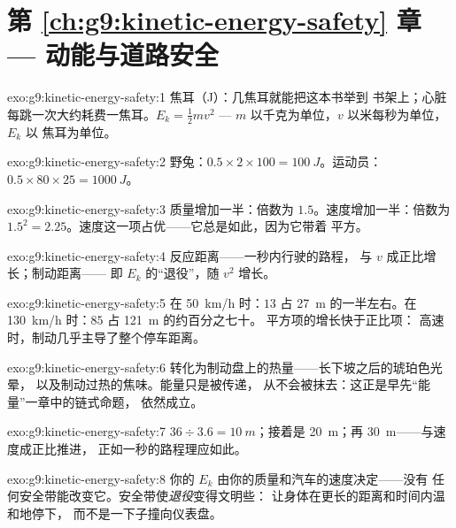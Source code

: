 \section*{第 \ref{ch:g9:kinetic-energy-safety} 章 --- 动能与道路安全}

\begin{solution}{exo:g9:kinetic-energy-safety:1}
焦耳（\unit{J}）：几焦耳就能把这本书举到
书架上；心脏每跳一次大约耗费一焦耳。$E_k = \frac12 m
v^2$ --- $m$ 以千克为单位，$v$ 以米每秒为单位，$E_k$ 以
焦耳为单位。
\end{solution}

\begin{solution}{exo:g9:kinetic-energy-safety:2}
野兔：$0.5 \times 2 \times 100 = \qty{100}{J}$。运动员：$0.5
\times 80 \times 25 = \qty{1000}{J}$。
\end{solution}

\begin{solution}{exo:g9:kinetic-energy-safety:3}
质量增加一半：倍数为 $1.5$。速度增加一半：倍数为 $1.5^2
= 2.25$。速度这一项占优——它总是如此，因为它带着
平方。
\end{solution}

\begin{solution}{exo:g9:kinetic-energy-safety:4}
反应距离——一秒内行驶的路程，
与 $v$ 成正比增长；制动距离——
即 $E_k$ 的“退役”，随 $v^2$ 增长。
\end{solution}

\begin{solution}{exo:g9:kinetic-energy-safety:5}
在 \qty{50}{km/h} 时：$13$ 占 \qty{27}{m} 的一半左右。在
\qty{130}{km/h} 时：$85$ 占 \qty{121}{m} 的约百分之七十。
平方项的增长快于正比项：
高速时，制动几乎主导了整个停车距离。
\end{solution}

\begin{solution}{exo:g9:kinetic-energy-safety:6}
转化为制动盘上的热量——长下坡之后的琥珀色光晕，
以及制动过热的焦味。能量只是被传递，
从不会被抹去：这正是早先“能量”一章中的链式命题，
依然成立。
\end{solution}

\begin{solution}{exo:g9:kinetic-energy-safety:7}
$36 \div 3.6 = \qty{10}{m}$；接着是 \qty{20}{m}；再
\qty{30}{m}——与速度成正比推进，
正如一秒的路程理应如此。
\end{solution}

\begin{solution}{exo:g9:kinetic-energy-safety:8}
你的 $E_k$ 由你的质量和汽车的速度决定——没有
任何安全带能改变它。安全带使\emph{退役}变得文明些：
让身体在更长的距离和时间内温和地停下，
而不是一下子撞向仪表盘。
\end{solution}

